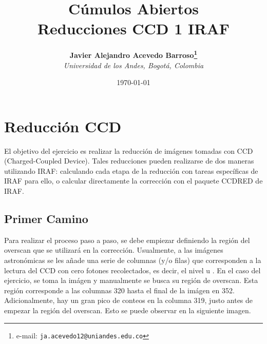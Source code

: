 \documentclass[12pt]{article}
\begin{document}
\title{Cúmulos Abiertos \\ Reducciones CCD 1 IRAF}

\author{
\textbf{Javier Alejandro Acevedo Barroso\thanks{e-mail: \texttt{ja.acevedo12@uniandes.edu.co}}}\\
\textit{Universidad de los Andes, Bogotá, Colombia}\\
 }%

\date{\today}
\maketitle %


\normalsize
\newpage


\section{Reducción CCD}

El objetivo del ejercicio es realizar la reducción de imágenes tomadas con CCD (Charged-Coupled Device). Tales reducciones pueden realizarse de dos maneras utilizando IRAF: calculando cada etapa de la reducción con tareas específicas de IRAF para ello, o calcular directamente la corrección con el paquete CCDRED de IRAF.



\subsection{Primer Camino}
Para realizar el proceso paso a paso, se debe empiezar definiendo la región del overscan que se utilizará en la corrección. Usualmente, a las imágenes astronómicas se les añade una serie de columnas (y/o filas) que corresponden a la lectura del CCD con cero fotones recolectados, es decir, el nivel  u \cite{handbookCCD}. En el caso del ejercicio, se toma la imágen  y manualmente se busca su región de overscan. Esta región corresponde a las columnas 320 hasta el final de la imágen en 352. Adicionalmente, hay un gran pico de conteos en la columna 319, justo antes de empezar la región del overscan. Esto se puede observar en la siguiente imagen. \\
\end{document}
